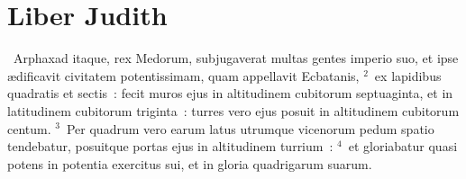 \clearpage
{\centering \section*{Liber Judith}}\thispagestyle{empty}

~Arphaxad itaque, rex Medorum, subjugaverat multas gentes imperio suo, et ipse \ae dificavit civitatem potentissimam, quam appellavit Ecbatanis,
${}^{2}$~ex lapidibus quadratis et sectis~: fecit muros ejus in altitudinem cubitorum septuaginta, et in latitudinem cubitorum triginta~: turres vero ejus posuit in altitudinem cubitorum centum.
${}^{3}$~Per quadrum vero earum latus utrumque vicenorum pedum spatio tendebatur, posuitque portas ejus in altitudinem turrium~:
${}^{4}$~et gloriabatur quasi potens in potentia exercitus sui, et in gloria quadrigarum suarum.



